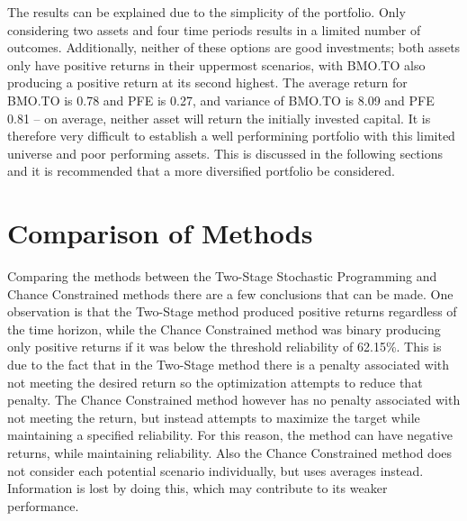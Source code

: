 \documentclass[12pt]{article}
\begin{document}
The results can be explained due to the simplicity of the portfolio.
Only considering two assets and four time periods results in a limited number of outcomes.
Additionally, neither of these options are good investments; both assets only have positive returns in their uppermost scenarios, with BMO.TO also producing a positive return at its second highest.
The average return for BMO.TO is 0.78 and PFE is 0.27, and variance of BMO.TO is 8.09 and PFE 0.81 -- on average, neither asset will return the initially invested capital.
It is therefore very difficult to establish a well performining portfolio with this limited universe and poor performing assets.
This is discussed in the following sections and it is recommended that a more diversified portfolio be considered.


\section{Comparison of Methods} %
Comparing the methods between the Two-Stage Stochastic Programming and Chance Constrained methods there are a few conclusions that can be made. One observation is that the Two-Stage method produced positive returns regardless of the time horizon, while the Chance Constrained method was binary producing only positive returns if it was below the threshold reliability of 62.15\%. This is due to the fact that in the Two-Stage method there is a penalty associated with not meeting the desired return so the optimization attempts to reduce that penalty. The Chance Constrained method however has no penalty associated with not meeting the return, but instead attempts to maximize the target while maintaining a specified reliability. For this reason, the method can have negative returns, while maintaining reliability. Also the Chance Constrained method does not consider each potential scenario individually, but uses averages instead. Information is lost by doing this, which may contribute to its weaker performance.
\end{document}
